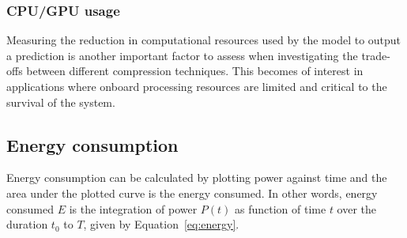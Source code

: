 \subsubsection{CPU/GPU usage}
Measuring the reduction in computational resources used by the model to output a prediction is another important factor to assess when investigating the trade-offs between different compression techniques.
%
This becomes of interest in applications where onboard processing resources are limited and critical to the survival of the system. 
%
%









\subsection{Energy consumption}
Energy consumption can be calculated by plotting power against time and the area under the plotted curve is the energy consumed.
%
In other words, energy consumed $E$ is the integration of power $P(t)$ as function of time $t$ over the duration $t_0$ to $T$, given by Equation~\ref{eq:energy}.

